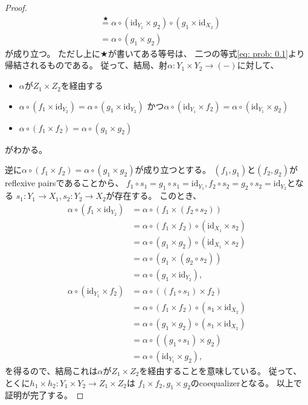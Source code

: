 \documentclass[uplatex]{jsarticle}
\theoremstyle{definition}
\def\id{\mathrm{id}}
\begin{document}
\begin{proof}
\begin{align*}
    &\overset{\bigstar}{=} \alpha \circ (\id_{Y_1}\times g_2)\circ (g_1\times \id_{X_2}) \\
    &= \alpha \circ (g_1\times g_2)
  \end{align*}
  が成り立つ。
  ただし上に\(\bigstar\)が書いてある等号は、
  二つの等式\eqref{eq: prob: 0.1}より帰結されるものである。
  従って、結局、射\(\alpha:Y_1\times Y_2\to (-)\)に対して、
  \begin{itemize}
    \item[ \ ]
    \(\alpha\)が\(Z_1\times Z_2\)を経由する
    \item[\(\Leftrightarrow\)]
    \(\alpha\circ (f_1\times \id_{Y_2}) = \alpha\circ (g_1\times \id_{Y_2})\)
    かつ\(\alpha\circ (\id_{Y_1}\times f_2) = \alpha\circ (\id_{Y_1}\times g_2)\)
    \item[\(\Rightarrow\)]
    \(\alpha\circ (f_1\times f_2) = \alpha \circ (g_1\times g_2)\)
  \end{itemize}
  がわかる。

  逆に\(\alpha\circ (f_1\times f_2) = \alpha \circ (g_1\times g_2)\)が成り立つとする。
  \((f_1,g_1)\)と\((f_2,g_2)\)がreflexive pairsであることから、
  \(f_1\circ s_1 = g_1 \circ s_1 = \id_{Y_1}, f_2\circ s_2 = g_2 \circ s_2 = \id_{Y_2}\)となる
  \(s_1:Y_1\to X_1, s_2: Y_2\to X_2\)が存在する。
  このとき、
  \begin{align*}
    \alpha\circ (f_1\times \id_{Y_2})
    &= \alpha\circ (f_1\times (f_2\circ s_2)) \\
    &= \alpha\circ (f_1\times f_2) \circ (\id_{X_1}\times s_2) \\
    &= \alpha\circ (g_1\times g_2) \circ (\id_{X_1}\times s_2) \\
    &= \alpha\circ (g_1\times (g_2\circ s_2)) \\
    &= \alpha\circ (g_1\times \id_{Y_2}), \\
    \alpha\circ (\id_{Y_1}\times f_2)
    &= \alpha\circ ((f_1\circ s_1)\times f_2) \\
    &= \alpha\circ (f_1\times f_2) \circ (s_1\times \id_{X_2}) \\
    &= \alpha\circ (g_1\times g_2) \circ (s_1\times \id_{X_2}) \\
    &= \alpha\circ ((g_1\circ s_1)\times g_2) \\
    &= \alpha\circ (\id_{Y_1}\times g_2),
  \end{align*}
  を得るので、結局これは\(\alpha\)が\(Z_1\times Z_2\)を経由することを意味している。
  従って、とくに\(h_1\times h_2:Y_1\times Y_2\to Z_1\times Z_2\)は
  \(f_1\times f_2, g_1\times g_2\)のcoequalizerとなる。
  以上で証明が完了する。
\end{proof}
\end{document}
